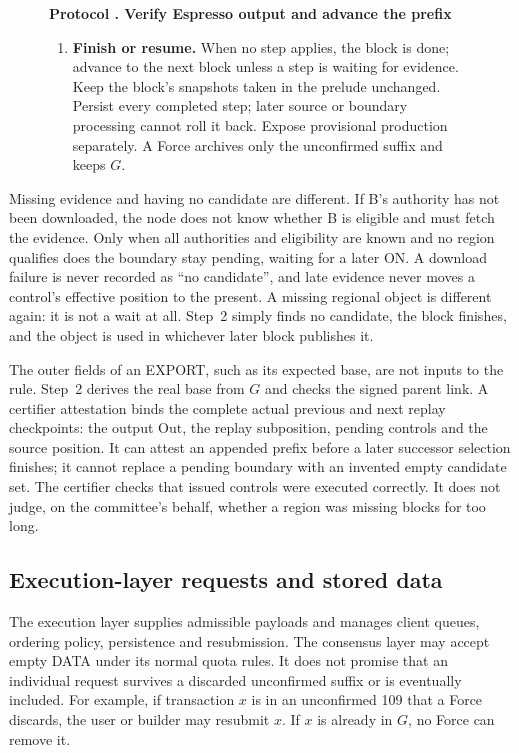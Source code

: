 \documentclass[11pt,a4paper]{article}
\newcounter{protocol}
\newenvironment{protocol}[3][htbp]{\begin{figure}[#1]\refstepcounter{protocol}\label{#2}
\begin{mdframed}[linewidth=.6pt,skipabove=0pt,skipbelow=0pt,
innertopmargin=7pt,innerbottommargin=7pt]\small
\textbf{Protocol \theprotocol. #3}\par\smallskip}{\end{mdframed}\end{figure}}
\begin{document}
\begin{protocol}{alg:external}{Verify Espresso output and advance the prefix}
\begin{enumerate}[label=\textbf{\arabic*)},itemsep=3pt]
\item \textbf{Finish or resume.} When no step applies, the block is
done; advance to the next block unless a step is waiting for evidence.
Keep the block's snapshots taken in the prelude unchanged. Persist every
completed step; later source or boundary processing cannot roll it back.
Expose provisional production separately. A Force archives only the
unconfirmed suffix and keeps $G$.
\end{enumerate}
\end{protocol}

Missing evidence and having no candidate are different. If B's authority
has not been downloaded, the node does not know whether B is eligible and
must fetch the evidence. Only when all authorities and eligibility are
known and no region qualifies does the boundary stay pending, waiting
for a later ON. A download failure is never recorded as ``no candidate'',
and late evidence never moves a control's effective position to the
present. A missing regional object is different again: it is not a wait
at all. Step~2 simply finds no candidate, the block finishes, and the
object is used in whichever later block publishes it.

The outer fields of an EXPORT, such as its expected base, are not inputs
to the rule. Step~2 derives the real base from $G$ and checks the signed
parent link. A certifier attestation binds the complete actual previous
and next replay checkpoints: the output $\mathrm{Out}$, the replay
subposition, pending controls and the source position. It can attest an
appended prefix before a later successor selection finishes; it cannot
replace a pending boundary with an invented empty candidate set. The certifier
checks that issued controls were executed correctly. It does not judge,
on the committee's behalf, whether a region was missing blocks for too
long.

\subsection{Execution-layer requests and stored data}
\label{sec:requests}
The execution layer supplies admissible payloads and manages client
queues, ordering policy, persistence and resubmission. The consensus
layer may accept empty DATA under its normal quota rules. It does not
promise that an individual request survives a discarded unconfirmed
suffix or is eventually included. For example, if transaction $x$ is in
an unconfirmed 109 that a Force discards, the user or builder may
resubmit $x$. If $x$ is already in $G$, no Force can remove it.
\end{document}
